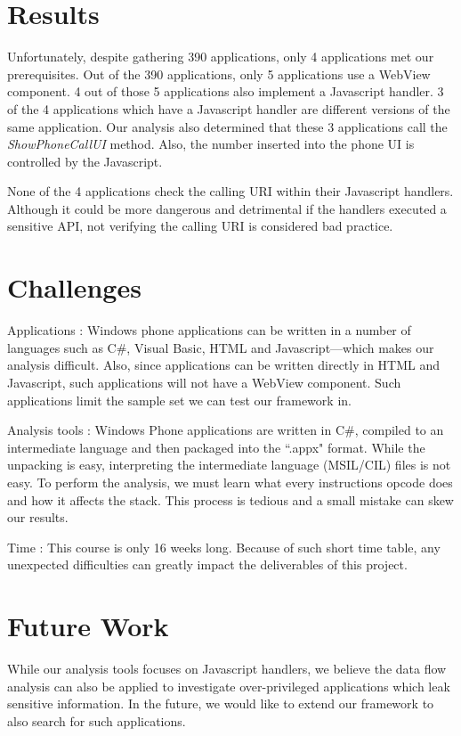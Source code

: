 \documentclass[conference]{IEEEtran}
\begin{document}
\section{Results}

Unfortunately, despite gathering 390 applications, only 4 applications met our prerequisites.
Out of the 390 applications, only 5 applications use a WebView component.
4 out of those 5 applications also implement a Javascript handler.
3 of the 4 applications which have a Javascript handler are different versions of the same application.
Our analysis also determined that these 3 applications call the \textit{ShowPhoneCallUI} method.
Also, the number inserted into the phone UI is controlled by the Javascript.

None of the 4 applications check the calling URI within their Javascript handlers.
Although it could be more dangerous and detrimental if the handlers executed a sensitive API, not verifying the calling URI is considered bad practice.

\section{Challenges}

Applications :  Windows phone applications can be written in a number of languages such as C\#, Visual Basic, HTML and Javascript---which makes our analysis difficult. Also, since applications can be written directly in HTML and Javascript, such applications will not have a WebView component. Such applications limit the sample set we can test our framework in.

Analysis tools : Windows Phone applications are written in C\#, compiled to an intermediate language and then packaged into the ``.appx" format. While the unpacking is easy, interpreting the intermediate language (MSIL/CIL) files is not easy. To perform the analysis, we must learn what every instructions opcode does and how it affects the stack. This process is tedious and a small mistake can skew our results.

Time : This course is only 16 weeks long. Because of such short time table, any unexpected difficulties can greatly impact the deliverables of this project.

\section{Future Work}

While our analysis tools focuses on Javascript handlers, we believe the data flow analysis can also be applied to investigate over-privileged applications which leak sensitive information.
In the future, we would like to extend our framework to also search for such applications.
\end{document}
